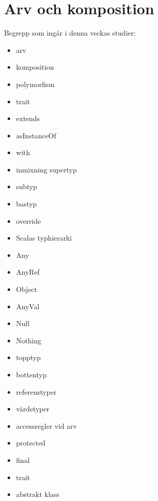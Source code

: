 \chapter{Arv och komposition}\label{chapter:W10}
Begrepp som ingår i denna veckas studier:
\begin{itemize}[noitemsep,label={$\square$},leftmargin=*]
\item arv
\item komposition
\item polymorfism
\item trait
\item extends
\item asInstanceOf
\item with
\item inmixning supertyp
\item subtyp
\item bastyp
\item override
\item Scalas typhierarki
\item Any
\item AnyRef
\item Object
\item AnyVal
\item Null
\item Nothing
\item topptyp
\item bottentyp
\item referenstyper
\item värdetyper
\item accessregler vid arv
\item protected
\item final
\item trait
\item abstrakt klass\end{itemize}
